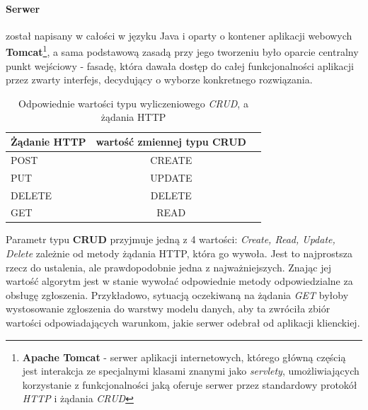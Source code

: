 		\paragraph{Serwer} został napisany w całości w języku Java i oparty o kontener aplikacji webowych 
			\textbf{Tomcat}\footnote{
				\textbf{Apache Tomcat} - serwer aplikacji internetowych, którego główną częścią jest interakcja
				ze specjalnymi klasami znanymi jako \textit{servlety}, umożliwiających korzystanie z funkcjonalności
				jaką oferuje serwer przez standardowy protokół \textit{HTTP} i żądania \textit{CRUD}		
			}, a sama podstawową zasadą przy jego tworzeniu było oparcie centralny punkt wejściowy - fasadę, która dawała
			dostęp do całej funkcjonalności aplikacji przez zwarty interfejs, decydujący o wyborze konkretnego rozwiązania.
			\begin{table}[H]
				\begin{tabular}[c]{l*{2}{c}}
					Żądanie HTTP	& 	wartość zmiennej typu CRUD	\\
					\hline
					POST			&	CREATE						\\
					PUT				& 	UPDATE						\\
					DELETE			&	DELETE						\\
					GET				& 	READ						\\
				\end{tabular}
				\label{c6:tab:CRUD_matches}
				\caption[Żądania HTTP a typ wyliczeniowy CRUD]{Odpowiednie wartości typu wyliczeniowego \textit{CRUD}, a żądania HTTP}
			\end{table}
			Parametr typu \textbf{CRUD} przyjmuje jedną z 4 wartości:
			\textit{Create, Read, Update, Delete} zależnie od metody żądania HTTP, która go wywoła. Jest to najprostsza rzecz
			do ustalenia, ale prawdopodobnie jedna z najważniejszych. Znając jej wartość algorytm jest w stanie wywołać
			odpowiednie metody odpowiedzialne za obsługę zgłoszenia. Przykładowo, sytuacją oczekiwaną na żądania 
			\textit{GET} byłoby wystosowanie zgłoszenia do warstwy modelu danych, aby ta zwróciła zbiór wartości odpowiadających
			warunkom, jakie serwer odebrał od aplikacji klienckiej. 
